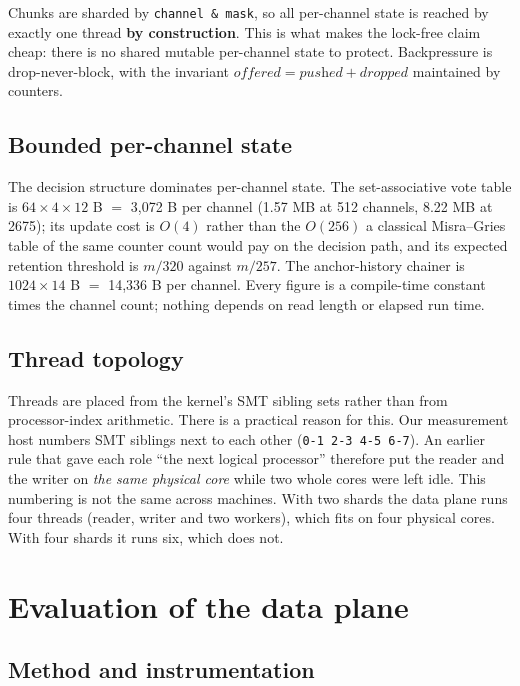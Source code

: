\documentclass[conference]{IEEEtran}
\begin{document}
Chunks are sharded by \texttt{channel \& mask}, so all per-channel state is reached by exactly
one thread \textbf{by construction}. This is what makes the lock-free claim cheap: there is no
shared mutable per-channel state to protect. Backpressure is drop-never-block, with the
invariant $\textit{offered} = \textit{pushed} + \textit{dropped}$ maintained by counters.

\subsection{Bounded per-channel state}

The decision structure dominates per-channel state. The set-associative vote table is
$64 \times 4 \times 12$ B $=$ 3,072 B per channel (1.57 MB at 512 channels, 8.22 MB at 2675);
its update cost is $O(4)$ rather than the $O(256)$ a classical Misra--Gries table of the same
counter count would pay on the decision path, and its expected retention threshold is $m/320$
against $m/257$. The anchor-history chainer is $1024 \times 14$ B $=$ 14,336 B per channel.
Every figure is a compile-time constant times the channel count; nothing depends on read length
or elapsed run time.

\subsection{Thread topology}

Threads are placed from the kernel's SMT sibling sets rather than from processor-index
arithmetic. There is a practical reason for this. Our measurement host numbers SMT siblings
next to each other (\texttt{0-1 2-3 4-5 6-7}). An earlier rule that gave each role ``the next
logical processor'' therefore put the reader and the writer on \emph{the same physical core}
while two whole cores were left idle. This numbering is not the same across machines. With two
shards the data plane runs four threads (reader, writer and two workers), which fits on four
physical cores. With four shards it runs six, which does not.

\section{Evaluation of the data plane}
\label{sec:eval}

\subsection{Method and instrumentation}
\end{document}
